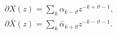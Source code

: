 \begin{equation}
\label{modeexp}
\begin{array}{l}
\partial X(z)=\sum_{k}\alpha_{k-\vartheta}z^{-k+\vartheta-1},\\
\partial \bar{X}(z)=\sum_{k}\bar{\alpha}_{k+\vartheta}z^{-k-\vartheta-1}.
\end{array}
\end{equation}

